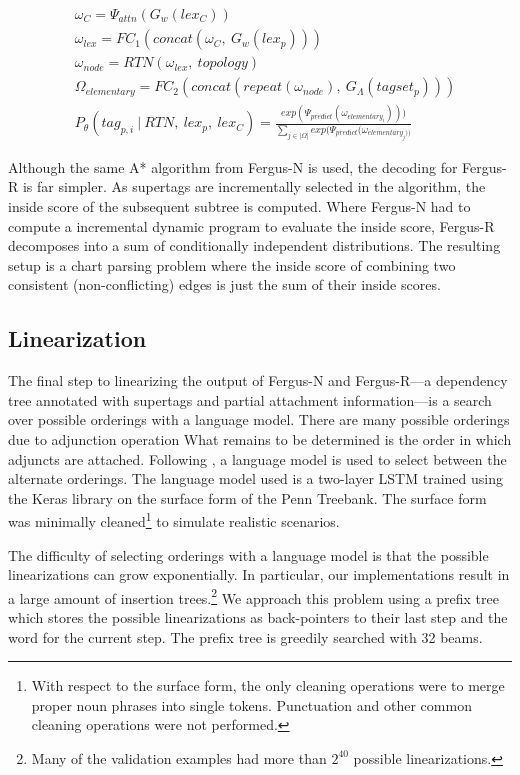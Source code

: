 \documentclass[11pt]{article}
\begin{document}
\begin{align}
&\omega_{C} = \Psi_{attn}(G_w(lex_C)) \label{eq:fergusr} \\
&\omega_{lex} = FC_1(concat(\omega_{C},~G_w(lex_p))) \nonumber \\
&\omega_{node} = RTN(\omega_{lex},~topology) \nonumber \\
&\Omega_{elementary} = FC_2(concat(repeat(\omega_{node}),~G_\Lambda(tagset_p))) \nonumber \\
&P_\theta(tag_{p,i}~|~RTN,~lex_p,~lex_{C}) = 
\frac{exp(\Psi_{predict}(\omega_{elementary_i})))}
{\sum_{j \in |\Omega|} exp(\Psi_{predict}(\omega_{elementary_j))}} \nonumber
\end{align}

Although the same A* algorithm from Fergus-N is used, the decoding for Fergus-R is far simpler.
%
As supertags are incrementally selected in the algorithm, the inside score of the subsequent subtree is computed.  
%
Where Fergus-N had to compute a incremental dynamic program to evaluate the inside score, Fergus-R decomposes into a sum of conditionally independent distributions. 
%
The resulting setup is a chart parsing problem where the inside score of combining two consistent (non-conflicting) edges is just the sum of their inside scores. 

\subsection{Linearization}

The final step to linearizing the output of Fergus-N and Fergus-R---a dependency tree annotated with supertags and partial attachment information---is a search over possible orderings with a language model. 
%
There are many possible orderings due to adjunction operation
What remains to be determined is the order in which adjuncts are attached. 
%
Following , a language model is used to select between the alternate orderings. 
%
The language model used is a two-layer LSTM trained using the Keras library on
the surface form of the Penn Treebank.
%
The surface form was minimally cleaned\footnote{With respect to the surface form, the only
cleaning operations were to merge proper noun phrases into single tokens.  Punctuation and other
common cleaning operations were not performed.} to simulate realistic scenarios.

The difficulty of selecting orderings with a language model is that the possible linearizations can grow exponentially.
%
In particular, our implementations result in a large amount of insertion trees.\footnote{Many of the validation examples had more than $2^{40}$ possible linearizations.}
%
We approach this problem using a prefix tree which stores the possible linearizations as back-pointers to their last step and the word for the current step. 
%
The prefix tree is greedily searched with 32 beams.
\end{document}
